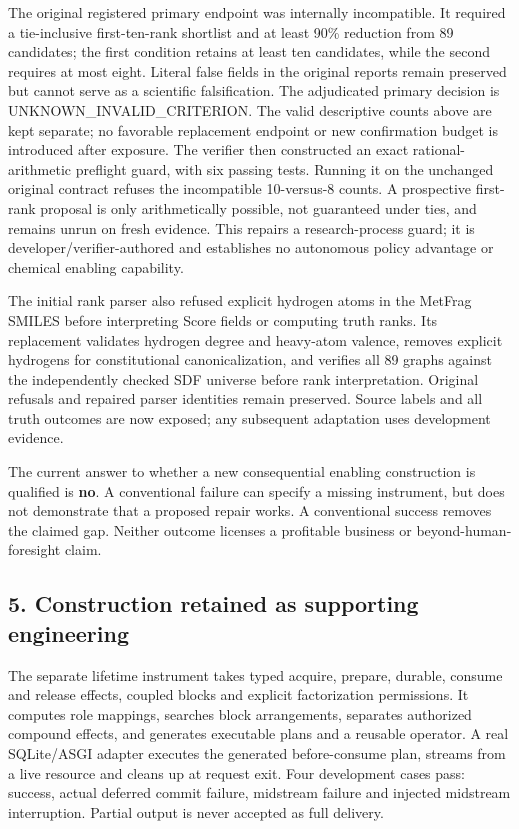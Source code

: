 \documentclass[
  10pt,
]{article}
\begin{document}
The original registered primary endpoint was internally incompatible. It
required a tie-inclusive first-ten-rank shortlist and at least 90\%
reduction from 89 candidates; the first condition retains at least ten
candidates, while the second requires at most eight. Literal false
fields in the original reports remain preserved but cannot serve as a
scientific falsification. The adjudicated primary decision is
UNKNOWN\_INVALID\_CRITERION. The valid descriptive counts above are kept
separate; no favorable replacement endpoint or new confirmation budget
is introduced after exposure. The verifier then constructed an exact
rational-arithmetic preflight guard, with six passing tests. Running it
on the unchanged original contract refuses the incompatible 10-versus-8
counts. A prospective first-rank proposal is only arithmetically
possible, not guaranteed under ties, and remains unrun on fresh
evidence. This repairs a research-process guard; it is
developer/verifier-authored and establishes no autonomous policy
advantage or chemical enabling capability.

The initial rank parser also refused explicit hydrogen atoms in the
MetFrag SMILES before interpreting Score fields or computing truth
ranks. Its replacement validates hydrogen degree and heavy-atom valence,
removes explicit hydrogens for constitutional canonicalization, and
verifies all 89 graphs against the independently checked SDF universe
before rank interpretation. Original refusals and repaired parser
identities remain preserved. Source labels and all truth outcomes are
now exposed; any subsequent adaptation uses development evidence.

The current answer to whether a new consequential enabling construction
is qualified is \textbf{no}. A conventional failure can specify a
missing instrument, but does not demonstrate that a proposed repair
works. A conventional success removes the claimed gap. Neither outcome
licenses a profitable business or beyond-human-foresight claim.

\hypertarget{construction-retained-as-supporting-engineering}{%
\subsection{5. Construction retained as supporting
engineering}\label{construction-retained-as-supporting-engineering}}

The separate lifetime instrument takes typed acquire, prepare, durable,
consume and release effects, coupled blocks and explicit factorization
permissions. It computes role mappings, searches block arrangements,
separates authorized compound effects, and generates executable plans
and a reusable operator. A real SQLite/ASGI adapter executes the
generated before-consume plan, streams from a live resource and cleans
up at request exit. Four development cases pass: success, actual
deferred commit failure, midstream failure and injected midstream
interruption. Partial output is never accepted as full delivery.
\end{document}
